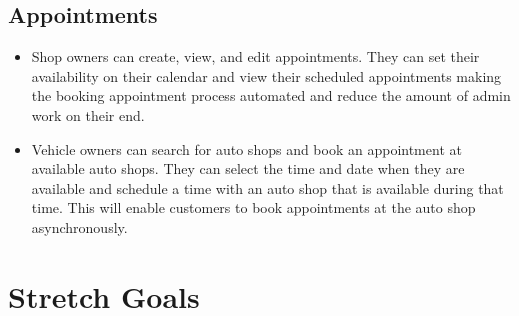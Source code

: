 \documentclass{article}
\begin{document}
\subsection{Appointments}
\begin{itemize}
\item Shop owners can create, view, and edit appointments. They can set their availability on their calendar and view their scheduled appointments making the booking appointment process automated and reduce the amount of admin work on their end.
\item Vehicle owners can search for auto shops and book an appointment at available auto shops. They can select the time and date when they are available and schedule a time with an auto shop that is available during that time. This will enable customers to book appointments at the auto shop asynchronously.
\end{itemize}

\section{Stretch Goals}
\end{document}
